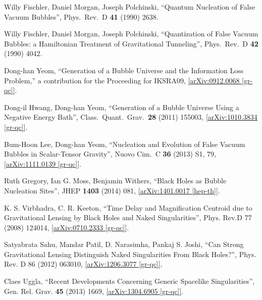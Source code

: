 \documentclass[12pt]{article}
\newcommand{\2}{$^2$}
\newcommand{\3}{$^3$}
\newcommand{\4}{$_4$}
\newcommand{\5}{$_5$}
\begin{document}
\begin{thebibliography}{400}
  Willy Fischler, Daniel Morgan, Joseph Polchinski, 
	``Quantum Nucleation of False Vacuum Bubbles'',
  Phys.\ Rev.\  D {\bf 41} (1990) 2638.
	
   Willy Fischler, Daniel Morgan, Joseph Polchinski, 
  ``Quantization of False Vacuum Bubbles: a Hamiltonian Treatment of Gravitational Tunneling'',
  Phys.\ Rev.\  D {\bf 42} (1990) 4042.
	


  Dong-han Yeom,
  ``Generation of a Bubble Universe and the Information Loss Problem,'' a contribution for the Proceeding for IKSRA09, 
  \href{http://arxiv.org/abs/0912.0068}{[arXiv:0912.0068 [gr-qc]]}.
 
Dong-il Hwang, Dong-han Yeom,
  ``Generation of a Bubble Universe Using a Negative Energy Bath'',
  Class.\ Quant.\ Grav.\  {\bf 28} (2011) 155003,
  \href{http://arxiv.org/abs/1010.3834}{[arXiv:1010.3834 [gr-qc]]}.

Bum-Hoon Lee, Dong-han Yeom,
  ``Nucleation and Evolution of False Vacuum Bubbles in Scalar-Tensor Gravity'',
  Nuovo Cim.\ C {\bf 36} (2013) S1, 79, \href{http://arxiv.org/abs/1111.0139}{[arXiv:1111.0139 [gr-qc]]}.
	


Ruth Gregory, Ian G. Moss, Benjamin Withers,
``Black Holes as Bubble Nucleation Sites'', JHEP \textbf{1403} (2014) 081, \href{http://arxiv.org/abs/1401.0017}{[arXiv:1401.0017 [hep-th]]}.


K. S. Virbhadra, C. R. Keeton, ``Time Delay and Magnification Centroid due to Gravitational Lensing by Black Holes and Naked Singularities'', Phys. Rev.D 77 (2008) 124014, \href{http://arxiv.org/abs/0710.2333}{[arXiv:0710.2333 [gr-qc]]}.

Satyabrata Sahu, Mandar Patil, D. Narasimha, Pankaj S. Joshi,
``Can Strong Gravitational Lensing Distinguish Naked Singularities From Black Holes?'', Phys. Rev. D 86 (2012) 063010,
\href{http://arxiv.org/abs/1206.3077}{[arXiv:1206.3077 [gr-qc]]}.

Claes Uggla, ``Recent Developments Concerning Generic Spacelike Singularities'', Gen. Rel. Grav. \textbf{45} (2013) 1669, \href{http://arxiv.org/abs/1304.6905}{[arXiv:1304.6905 [gr-qc]]}.



\end{thebibliography}
\end{document}

